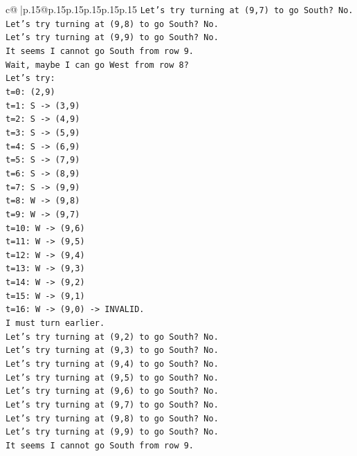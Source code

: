 \documentclass{article}
\begin{document}
{\begin{supertabular}{c@{$\;$}|p{.15\linewidth}@{}p{.15\linewidth}p{.15\linewidth}p{.15\linewidth}p{.15\linewidth}p{.15\linewidth}}
{{{\texttt{Let's try turning at (9,7) to go South? No.} \\
\texttt{Let's try turning at (9,8) to go South? No.} \\
\texttt{Let's try turning at (9,9) to go South? No.} \\
\texttt{It seems I cannot go South from row 9.} \\
\texttt{Wait, maybe I can go West from row 8?} \\
\texttt{Let's try:} \\
\texttt{t=0: (2,9)} \\
\texttt{t=1: S {-}> (3,9)} \\
\texttt{t=2: S {-}> (4,9)} \\
\texttt{t=3: S {-}> (5,9)} \\
\texttt{t=4: S {-}> (6,9)} \\
\texttt{t=5: S {-}> (7,9)} \\
\texttt{t=6: S {-}> (8,9)} \\
\texttt{t=7: S {-}> (9,9)} \\
\texttt{t=8: W {-}> (9,8)} \\
\texttt{t=9: W {-}> (9,7)} \\
\texttt{t=10: W {-}> (9,6)} \\
\texttt{t=11: W {-}> (9,5)} \\
\texttt{t=12: W {-}> (9,4)} \\
\texttt{t=13: W {-}> (9,3)} \\
\texttt{t=14: W {-}> (9,2)} \\
\texttt{t=15: W {-}> (9,1)} \\
\texttt{t=16: W {-}> (9,0) {-}> INVALID.} \\
\texttt{I must turn earlier.} \\
\texttt{Let's try turning at (9,2) to go South? No.} \\
\texttt{Let's try turning at (9,3) to go South? No.} \\
\texttt{Let's try turning at (9,4) to go South? No.} \\
\texttt{Let's try turning at (9,5) to go South? No.} \\
\texttt{Let's try turning at (9,6) to go South? No.} \\
\texttt{Let's try turning at (9,7) to go South? No.} \\
\texttt{Let's try turning at (9,8) to go South? No.} \\
\texttt{Let's try turning at (9,9) to go South? No.} \\
\texttt{It seems I cannot go South from row 9.} \\
}}}
\end{supertabular}}
\end{document}
